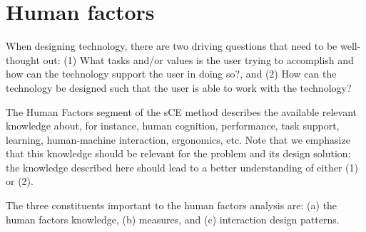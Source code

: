\section{Human factors}
\label{sec:human-factors}
When designing technology, there are two driving questions that need to be well-thought out: (1) What tasks and/or values is the user trying to accomplish and how can the technology support the user in doing so?, and (2) How can the technology be designed such that the user is able to work with the technology?

The Human Factors segment of the sCE method describes the available relevant knowledge about, for instance, human cognition, performance, task support, learning, human-machine interaction, ergonomics, etc. Note that we emphasize that this knowledge should be relevant for the problem and its design solution: the knowledge described here should lead to a better understanding of either (1) or (2).

The three constituents important to the human factors analysis are: (a) the human factors knowledge, (b) measures, and (c) interaction design patterns.

